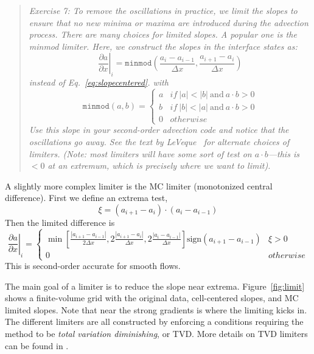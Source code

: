\documentclass[11pt]{article}
\begin{document}
\begin{quote}
{\em Exercise 7:   To remove the oscillations in
practice, we limit the slopes to ensure that no new minima or maxima are
introduced during the advection process.  There are many choices for
limited slopes.  A popular one is the {\em minmod} limiter.  Here, we
construct the slopes in the interface states as:
\begin{equation}
\left . \frac{\partial a}{\partial x} \right |_i = \mathtt{minmod} \left (
  \frac{a_i - a_{i-1}}{\Delta x}, \frac{a_{i+1} - a_i}{\Delta x} \right )
\end{equation}
instead of Eq.~\ref{eq:slopecentered}.
with 
\begin{equation}
\mathtt{minmod}(a,b) = \left \{ 
    \begin{array}{ll}
    a & \mathit{if~} |a| < |b| \mathrm{~and~} a\cdot b > 0 \\
    b & \mathit{if~} |b| < |a| \mathrm{~and~} a\cdot b > 0 \\
    0 & \mathit{otherwise}
    \end{array}
  \right .
\end{equation}
Use this slope in your second-order advection code and notice that
the oscillations go away.  See the text by LeVeque~\cite{leveque:2002} for alternate choices of 
limiters. (Note: most limiters will have some sort of test on $a\cdot b$---this is $< 0$ at an extremum, which is precisely where we want to limit).
}
\end{quote}

A slightly more complex limiter is the MC limiter (monotonized central
difference).  First we define an extrema test,
\begin{equation}
\xi = (a_{i+1} - a_i) \cdot (a_i - a_{i-1})
\end{equation}
Then the limited difference is
\begin{equation}
\left . \frac{\partial a}{\partial x} \right |_i = 
 \left \{
\begin{array}{ll}
\min \left [ \frac{| a_{i+1} - a_{i-1} |}{2 \Delta x},
              2 \frac{| a_{i+1} - a_i |}{\Delta x},
              2 \frac{| a_{i} - a_{i-1} |}{\Delta x}
      \right ]  \mathrm{sign}(a_{i+1} - a_{i-1}) &  \xi > 0 \\
0 & \mathit{otherwise}
\end{array}
\right .
\end{equation}
%
This is second-order accurate for smooth flows.  

The main goal of a limiter is to reduce the slope near extrema.
Figure~\ref{fig:limit} shows a finite-volume grid with the original
data, cell-centered slopes, and MC limited slopes.  Note that near the
strong gradients is where the limiting kicks in.  The different limiters
are all constructed by enforcing a conditions requiring the method to be
{\em total variation diminishing}, or TVD.  More details on TVD limiters
can be found in \cite{toro:1997,leveque:2002}.
\end{document}

